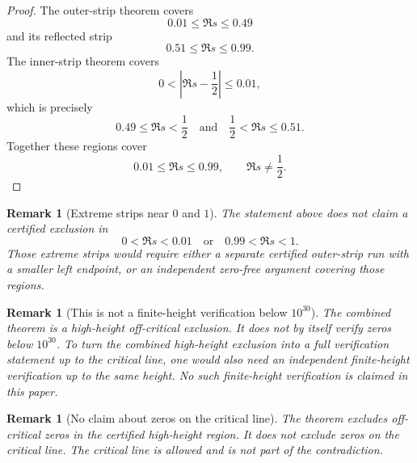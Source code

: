 \documentclass[11pt]{article}
\newtheorem{remark}[theorem]{Remark}
\begin{document}
\begin{proof}
The outer-strip theorem covers
\[
        0.01\le\Re s\le0.49
\]
and its reflected strip
\[
        0.51\le\Re s\le0.99.
\]
The inner-strip theorem covers
\[
        0<\left|\Re s-\frac12\right|\le0.01,
\]
which is precisely
\[
        0.49\le\Re s<\frac12
        \quad\text{and}\quad
        \frac12<\Re s\le0.51.
\]
Together these regions cover
\[
        0.01\le\Re s\le0.99,
        \qquad
        \Re s\ne\frac12.
\]
\end{proof}

\begin{remark}[Extreme strips near \(0\) and \(1\)]
The statement above does not claim a certified exclusion in
\[
        0<\Re s<0.01
        \quad\text{or}\quad
        0.99<\Re s<1.
\]
Those extreme strips would require either a separate certified outer-strip run
with a smaller left endpoint, or an independent zero-free argument covering
those regions.
\end{remark}

\begin{remark}[This is not a finite-height verification below \(10^{30}\)]
The combined theorem is a high-height off-critical exclusion.  It does not by
itself verify zeros below \(10^{30}\).  To turn the combined high-height
exclusion into a full verification statement up to the critical line, one would
also need an independent finite-height verification up to the same height.
No such finite-height verification is claimed in this paper.
\end{remark}

\begin{remark}[No claim about zeros on the critical line]
The theorem excludes off-critical zeros in the certified high-height region.
It does not exclude zeros on the critical line.  The critical line is allowed
and is not part of the contradiction.
\end{remark}

\end{document}
